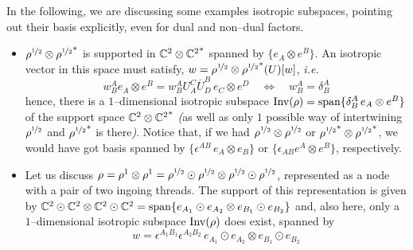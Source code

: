 \begin{example}\label{isotr_basis}
In the following, we are discussing some examples isotropic subspaces, pointing out their basis explicitly, even for dual and non--dual factors.
    \begin{itemize}
        \item $\rho^{\nicefrac{1}{2}}\otimes{\rho^{\nicefrac{1}{2}}}^*$ is supported in $\mathbb{C}^2\otimes{\mathbb{C}^2}^*$ spanned by $\{e_A\otimes e^B\}$. An isotropic vector in this space must satisfy, $w=\rho^{\nicefrac{1}{2}}\otimes{\rho^{\nicefrac{1}{2}}}^*(U)[w]$, \emph{i.e.}
        $$w_B^Ae_A\otimes e^B=w_B^AU_A^C\overline{U}_D^B\,e_C\otimes e^D\quad\Leftrightarrow\quad w_B^A=\delta_B^A$$
        hence, there is a $1$--dimensional isotropic subspace $\text{\normalfont Inv}(\rho)=\operatorname{span}\{\delta_B^A\,e_A\otimes e^B\}$ of the support space $\mathbb{C}^2\otimes{\mathbb{C}^2}^*$ \emph{(}as well as only $1$ possible way of intertwining $\rho^{\nicefrac{1}{2}}$ and ${\rho^{\nicefrac{1}{2}}}^*$ is there\emph{)}. Notice that, if we had $\rho^{\nicefrac{1}{2}}\otimes\rho^{\nicefrac{1}{2}}$ or ${\rho^{\nicefrac{1}{2}}}^*\otimes{\rho^{\nicefrac{1}{2}}}^*$, we would have got basis spanned by $\{\epsilon^{AB}\,e_A\otimes e_B\}$ or $\{\epsilon_{AB}e^A\otimes e^B\}$, respectively.

        \item Let us discuss $\rho={\rho^1}\otimes{\rho^1}={\rho^{\nicefrac{1}{2}}}\odot{\rho^{\nicefrac{1}{2}}}\otimes{\rho^{\nicefrac{1}{2}}}\odot{\rho^{\nicefrac{1}{2}}}$, represented as a node with  a pair of two ingoing threads. The support of this representation is given by $\mathbb{C}^2\odot\mathbb{C}^2\otimes\mathbb{C}^2\odot\mathbb{C}^2=\operatorname{span}\{e_{A_1}\odot e_{A_2}\otimes e_{B_1}\odot e_{B_2}\}$ and, also here, only a $1$--dimensional isotropic subspace $\text{\normalfont Inv}(\rho)$ does exist, spanned by 
        $$w=\epsilon^{A_1B_1}\epsilon^{A_2B_2}\,e_{A_1}\odot e_{A_2}\otimes e_{B_1}\odot e_{B_2}$$


\end{itemize}
\end{example}
